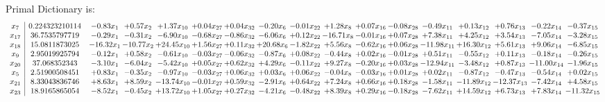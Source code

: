 \documentclass[9pt]{article}
\begin{document}
Primal Dictionary is:
\[\begin{array}{c| c c@{\hskip 2pt} c@{\hskip 2pt} c@{\hskip 2pt} c@{\hskip 2pt} c@{\hskip 2pt} c@{\hskip 2pt} c@{\hskip 2pt} c@{\hskip 2pt} c@{\hskip 2pt} c@{\hskip 2pt} c@{\hskip 2pt} c@{\hskip 2pt} c@{\hskip 2pt} c@{\hskip 2pt} c@{\hskip 2pt} }
 x_{7}   &  0.224323210114 & -0.83 x_{1} & +  0.57 x_{2} & +  1.37 x_{10} & +  0.04 x_{27} & +  0.04 x_{32} & -0.20 x_{6} & -0.01 x_{22} & +  1.28 x_{8} & +  0.07 x_{16} & -0.08 x_{28} & -0.49 x_{11} & +  0.13 x_{12} & +  0.76 x_{13} & -0.22 x_{14} & -0.37 x_{15}\\
 x_{17}   &  36.7535797719 & -0.29 x_{1} & -0.31 x_{2} & -6.90 x_{10} & -0.68 x_{27} & -0.86 x_{32} & -6.06 x_{6} & +  0.12 x_{22} & -16.71 x_{8} & -0.01 x_{16} & +  0.07 x_{28} & +  7.38 x_{11} & +  4.25 x_{12} & +  3.54 x_{13} & -7.05 x_{14} & -3.28 x_{15}\\
 x_{18}   &  15.0811873025 & -16.32 x_{1} & -10.77 x_{2} & + 24.45 x_{10} & +  1.56 x_{27} & +  0.11 x_{32} & + 20.68 x_{6} & -1.82 x_{22} & +  5.56 x_{8} & -0.62 x_{16} & +  0.06 x_{28} & -11.98 x_{11} & + 16.30 x_{12} & +  5.61 x_{13} & +  9.06 x_{14} & -6.85 x_{15}\\
 x_{9}   &  2.95019925794 & -0.12 x_{1} & +  0.58 x_{2} & -0.61 x_{10} & -0.03 x_{27} & -0.06 x_{32} & -0.87 x_{6} & +  0.08 x_{22} & -0.44 x_{8} & +  0.02 x_{16} & -0.01 x_{28} & +  0.51 x_{11} & -0.55 x_{12} & +  0.11 x_{13} & -0.18 x_{14} & -0.26 x_{15}\\
 x_{20}   &  37.068352343 & -3.10 x_{1} & -6.04 x_{2} & -5.42 x_{10} & +  0.05 x_{27} & +  0.62 x_{32} & +  4.29 x_{6} & -0.11 x_{22} & +  9.27 x_{8} & -0.20 x_{16} & +  0.03 x_{28} & -12.94 x_{11} & -3.48 x_{12} & +  0.87 x_{13} & -11.00 x_{14} & -1.96 x_{15}\\
 x_{5}   &  2.51900508451 & +  0.83 x_{1} & -0.35 x_{2} & -0.97 x_{10} & -0.03 x_{27} & +  0.06 x_{32} & +  0.03 x_{6} & +  0.06 x_{22} & -0.04 x_{8} & -0.03 x_{16} & +  0.01 x_{28} & +  0.02 x_{11} & -0.87 x_{12} & -0.47 x_{13} & -0.54 x_{14} & +  0.02 x_{15}\\
 x_{21}   &  8.33043836746 & +  8.63 x_{1} & +  8.59 x_{2} & -13.74 x_{10} & -0.01 x_{27} & +  0.59 x_{32} & -2.91 x_{6} & +  0.64 x_{22} & +  7.24 x_{8} & +  0.66 x_{16} & +  0.18 x_{28} & -1.58 x_{11} & -11.89 x_{12} & -12.37 x_{13} & -7.42 x_{14} & +  4.58 x_{15}\\
 x_{23}   &  18.9165865054 & -8.52 x_{1} & -0.45 x_{2} & + 13.72 x_{10} & +  1.05 x_{27} & +  0.27 x_{32} & -4.21 x_{6} & -0.48 x_{22} & +  8.39 x_{8} & +  0.29 x_{16} & -0.18 x_{28} & -7.62 x_{11} & + 14.59 x_{12} & +  6.73 x_{13} & +  7.83 x_{14} & -11.32 x_{15}\\

\end{array}\]
\end{document}
